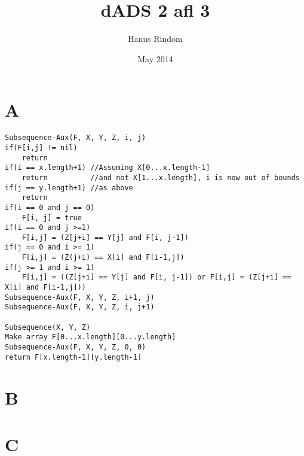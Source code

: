 \documentclass{article}
\title{dADS 2 afl 3}
\author{Hanus Rindom}
\date{May 2014}
\begin{document}
\maketitle

\section*{A}

\begin{lstlisting}
Subsequence-Aux(F, X, Y, Z, i, j)
if(F[i,j] != nil)
	return
if(i == x.length+1) //Assuming X[0...x.length-1]
	return          //and not X[1...x.length], i is now out of bounds
if(j == y.length+1) //as above
	return
if(i == 0 and j == 0)
	F[i, j] = true
if(i == 0 and j >=1)
	F[i,j] = (Z[j+i] == Y[j] and F[i, j-1])
if(j == 0 and i >= 1)
	F[i,j] = (Z(j+i) == X[i] and F[i-1,j])
if(j >= 1 and i >= 1)
	F[i,j] = ((Z[j+i] == Y[j] and F[i, j-1]) or F[i,j] = (Z[j+i] == X[i] and F[i-1,j]))
Subsequence-Aux(F, X, Y, Z, i+1, j)
Subsequence-Aux(F, X, Y, Z, i, j+1)

Subsequence(X, Y, Z)
Make array F[0...x.length][0...y.length]
Subsequence-Aux(F, X, Y, Z, 0, 0)
return F[x.length-1][y.length-1]

\end{lstlisting}

\section*{B}

\section*{C}
\end{document}
